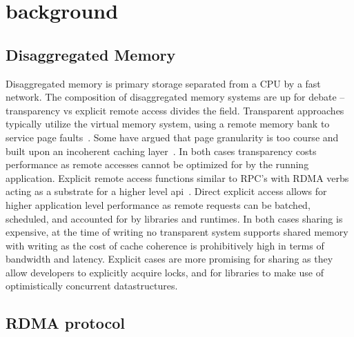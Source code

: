 \section{background}

\subsection{Disaggregated Memory}

Disaggregated memory is primary storage separated from a CPU
by a fast network. The composition of disaggregated memory
systems are up for debate -- transparency vs explicit remote
access divides the field. Transparent approaches typically
utilize the virtual memory system, using a remote memory
bank to service page faults~\cite{infiniswap, leap,
fastswap}. Some have argued that page granularity is too
course and built upon an incoherent caching
layer~\cite{kona, legoos}. In both cases transparency costs
performance as remote accesses cannot be optimized for by
the running application. Explicit remote access functions
similar to RPC's with RDMA verbs acting as a substrate for a
higher level api~\cite{aifm,reigons,clover,sherman,faast}.
Direct explicit access allows for higher application level
performance as remote requests can be batched, scheduled,
and accounted for by libraries and runtimes. In both cases
sharing is expensive, at the time of writing no transparent
system supports shared memory with writing as the cost of
cache coherence is prohibitively high in terms of bandwidth
and latency. Explicit cases are more promising for sharing
as they allow developers to explicitly acquire locks, and for
libraries to make use of optimistically concurrent
datastructures.

\subsection{RDMA protocol}


